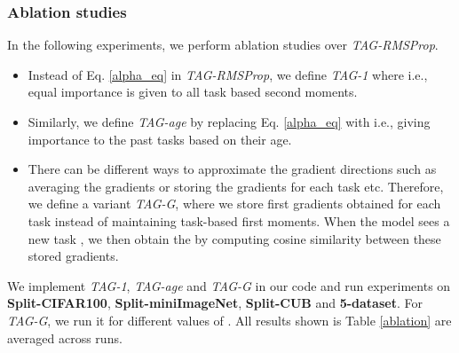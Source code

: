 \documentclass{article} \usepackage{collas2022_conference,times}
\begin{document}
{
\subsubsection{Ablation studies}\label{variant_sec}
In the following experiments, we perform ablation studies over \textit{TAG-RMSProp}. 

\begin{itemize}
    \item Instead of Eq. \ref{alpha_eq} in \textit{TAG-RMSProp}, we define \textit{TAG-1} where  i.e., equal importance is given to all task based second moments.
    \item Similarly, we define \textit{TAG-age} by replacing Eq. \ref{alpha_eq} with  i.e., giving importance to the past tasks based on their age. 
    \item There can be different ways to approximate the gradient directions such as averaging the gradients or storing the gradients for each task etc. Therefore, we define a variant \textit{TAG-G}, where we store first  gradients obtained for each task instead of maintaining task-based first moments. When the model sees a new task , we then obtain the  by computing cosine similarity between these stored gradients. \end{itemize}

We implement \textit{TAG-1}, \textit{TAG-age} and \textit{TAG-G} in our code and run experiments on \textbf{Split-CIFAR100}, \textbf{Split-miniImageNet}, \textbf{Split-CUB} and \textbf{5-dataset}. For \textit{TAG-G}, we run it for different values of . All results shown is Table \ref{ablation} are averaged across  runs.


}
\end{document}
